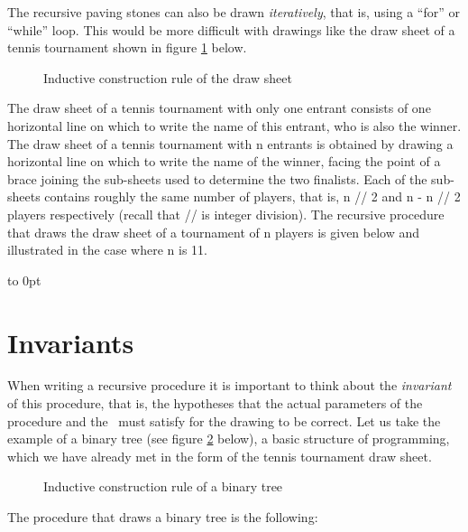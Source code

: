 The recursive paving stones can also be drawn {\em iteratively}, that is, using
a ``for'' or ``while'' loop. This would be more difficult with drawings like the draw sheet of a tennis
tournament shown in figure \ref{fig:tabtour} below.
\begin{figure}[htbp]
 \caption{Inductive construction rule of the draw sheet\label{fig:tabtour}}
\end{figure}

The draw sheet of a tennis tournament with only one entrant consists of one horizontal line
on which to write the name of this entrant, who is also the winner. The draw sheet of a
tennis tournament with {\idt n} en\-trants is obtained by drawing a horizontal line
on which to write the name of the winner, facing the point of a brace joining the
sub-sheets used to determine the two finalists. Each of the sub-sheets contains roughly
the same number of players, that is, {\idt n // 2} and
{\idt n - n // 2} players respectively (recall that {\idt //} is integer division). The recursive procedure that draws the draw sheet of a
tournament of {\idt n} players is given below and illustrated in the case where {\idt n} is 11.

 {
 \vbox to 0pt{\vspace*{3cm}}%
 
 }
\section{Invariants}
When writing a recursive procedure it is important to think about the {\em in\-va\-ri\-ant\/}
of this procedure, that is, the hypotheses that the actual parameters
of the procedure and the \robot\ must satisfy for the drawing to be correct. Let us take the example of a
binary tree (see figure \ref{fig:arbin} below), a basic structure of
programming, which we have already met in the form of the tennis tournament draw sheet.
\begin{figure}[htbp]
 \caption{Inductive construction rule of a binary tree}\label{fig:arbin}
\end{figure}

\noindent The procedure that draws a binary tree is the following:



